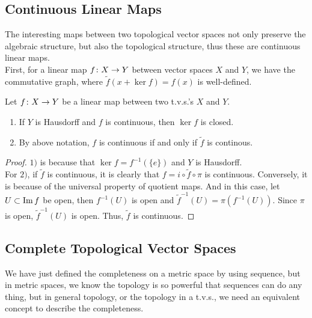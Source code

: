 \documentclass[a4paper,11pt]{report}
\begin{document}
\subsection{Continuous Linear Maps}

The interesting maps between two topological vector spaces not only preserve the algebraic structure, but also the topological structure, thus these are continuous linear maps.\\
First, for a linear map $f \colon X \rightarrow Y$ between vector spaces $X$ and $Y$, we have the commutative graph, where $\tilde{f}(x+\ker{f}) = f(x)$ is well-defined.
\begin{center}
\end{center}

\begin{prop} \label{prop3}
	Let $f \colon X \rightarrow Y$ be a linear map between two t.v.s.'s $X$ and $Y$.
	\begin{enumerate}[label=\arabic*)]
		\item If $Y$ is Hausdorff and $f$ is continuous, then $\ker{f}$ is closed.
		\item By above notation, $f$ is continuous if and only if $\tilde{f}$ is continous.
	\end{enumerate}
\end{prop}
\begin{proof} 
	$1)$ is because that $\ker{f} = f^{-1}(\{e\})$ and $Y$ is Hausdorff.\\
	For $2)$, if $\tilde{f}$ is continuous, it is clearly that $f = i \circ \tilde{f} \circ \pi$ is continuous. Conversely, it is because of the universal property of quotient maps. And in this case, let $U \subset \operatorname{Im}{f}$ be open, then $f^{-1}(U)$ is open and $\tilde{f}^{-1}(U) = \pi(f^{-1}(U))$. Since $\pi$ is open, $\tilde{f}^{-1}(U)$ is open. Thus, $\tilde{f}$ is continuous.
\end{proof}

\subsection{Complete Topological Vector Spaces}

We have just defined the completeness on a metric space by using sequence, but in metric spaces, we know the topology is so powerful that sequences can do any thing, but in general topology, or the topology in a t.v.s., we need an equivalent concept to describe the completeness.
\end{document}
